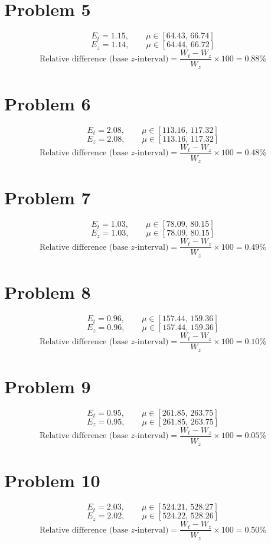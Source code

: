 \section*{Problem 5}
\[
E_t = 1.15,\qquad \mu \in[64.43,\,66.74]
\]
\[
E_z = 1.14,\qquad \mu \in[64.44,\,66.72]
\]
\[
\text{Relative difference (base }z\text{-interval)}=\frac{W_t-W_z}{W_z}\times 100 = 0.88\%
\]

\section*{Problem 6}
\[
E_t = 2.08,\qquad \mu \in[113.16,\,117.32]
\]
\[
E_z = 2.08,\qquad \mu \in[113.16,\,117.32]
\]
\[
\text{Relative difference (base }z\text{-interval)}=\frac{W_t-W_z}{W_z}\times 100 = 0.48\%
\]

\section*{Problem 7}
\[
E_t = 1.03,\qquad \mu \in[78.09,\,80.15]
\]
\[
E_z = 1.03,\qquad \mu \in[78.09,\,80.15]
\]
\[
\text{Relative difference (base }z\text{-interval)}=\frac{W_t-W_z}{W_z}\times 100 = 0.49\%
\]

\section*{Problem 8}
\[
E_t = 0.96,\qquad \mu \in[157.44,\,159.36]
\]
\[
E_z = 0.96,\qquad \mu \in[157.44,\,159.36]
\]
\[
\text{Relative difference (base }z\text{-interval)}=\frac{W_t-W_z}{W_z}\times 100 = 0.10\%
\]

\section*{Problem 9}
\[
E_t = 0.95,\qquad \mu \in[261.85,\,263.75]
\]
\[
E_z = 0.95,\qquad \mu \in[261.85,\,263.75]
\]
\[
\text{Relative difference (base }z\text{-interval)}=\frac{W_t-W_z}{W_z}\times 100 = 0.05\%
\]

\section*{Problem 10}
\[
E_t = 2.03,\qquad \mu \in[524.21,\,528.27]
\]
\[
E_z = 2.02,\qquad \mu \in[524.22,\,528.26]
\]
\[
\text{Relative difference (base }z\text{-interval)}=\frac{W_t-W_z}{W_z}\times 100 = 0.50\%
\]


